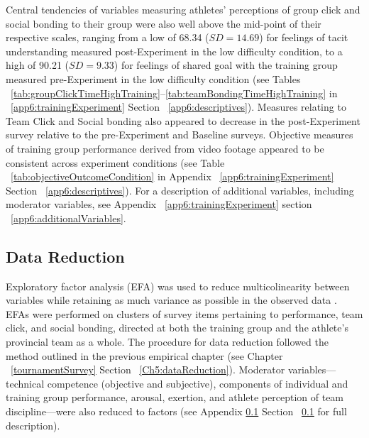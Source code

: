 Central tendencies of variables measuring athletes' perceptions of group click and social bonding to their group were also well above the mid-point of their respective scales, ranging from a low of 68.34 ($SD = 14.69$) for feelings of tacit understanding measured post-Experiment in the low difficulty condition, to a high of 90.21 ($SD = 9.33$) for feelings of shared goal with the training group measured pre-Experiment in the low difficulty condition (see Tables ~\ref{tab:groupClickTimeHighTraining}\nobreakdash--\ref{tab:teamBondingTimeHighTraining} in ~\ref{app6:trainingExperiment} Section ~\ref{app6:descriptives}).  Measures relating to Team Click and Social bonding also appeared to decrease in the post-Experiment survey relative to the pre-Experiment and Baseline surveys.  Objective measures of training group performance derived from video footage appeared to be consistent across experiment conditions (see Table ~\ref{tab:objectiveOutcomeCondition} in Appendix ~\ref{app6:trainingExperiment} Section ~\ref{app6:descriptives}).
For a description of additional variables, including moderator variables, see Appendix ~\ref{app6:trainingExperiment} section ~\ref{app6:additionalVariables}.



\subsection{Data Reduction}
Exploratory factor analysis (EFA) was used to reduce multicolinearity between variables while retaining as much variance as possible in the observed data \citep[, see Appendix ~\ref{app5:EFA}]{Yong2013}.
EFAs were performed on clusters of survey items pertaining to performance, team click, and social bonding, directed at both the training group and the athlete's provincial team as a whole.  The procedure for data reduction followed the method outlined in the previous empirical chapter (see Chapter ~\ref{tournamentSurvey} Section ~\ref{Ch5:dataReduction}).  Moderator variables---technical competence (objective and subjective), components of individual and training group performance, arousal, exertion, and athlete perception of team discipline---were also reduced to factors (see Appendix \ref{} Section ~\ref{} for full description).

